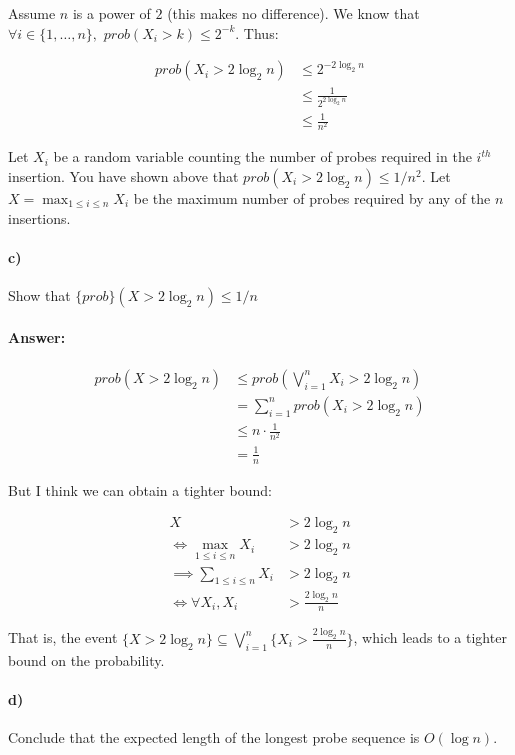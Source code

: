 \documentclass[a4paper]{article}
\begin{document}
Assume $n$ is a power of $2$ (this makes no difference). We know that $\forall i \in \{1, \ldots, n\},$
${prob}(X_i > k) \le 2^{-k}$. Thus:

\begin{align*}
{prob}(X_i > 2 \log_2 n) & \le 2^{-2\log_2 n} \\
& \le \frac{1}{2^{2 \log_2 n}} \\
& \le \frac{1}{n^2}
\end{align*}


\noindent Let $X_i$ be a random variable counting the number of probes required in the $i^{th}$ insertion. You have shown above that ${prob}(X_i > 2 \log_2 n) \le 1/n^2$. Let $X = \max_{1 \le i \le n} X_i$ be the maximum number of probes required by any of the $n$ insertions.


\paragraph{c)} Show that $\{prob\}(X > 2 \log_2 n) \le 1/n$


\paragraph{Answer:}

\begin{align*}
{prob}(X > 2 \log_2 n) & \le {prob}(\bigvee\limits_{i=1}^n X_i > 2 \log_2 n) \\
& = \sum\limits_{i=1}^n {prob}(X_i > 2 \log_2 n) \\
& \le n \cdot \frac{1}{n^2} \\
& = \frac{1}{n}
\end{align*}

But I think we can obtain a tighter bound:

\begin{align*}
X & > 2 \log_2 n \\
\iff \max\limits_{1 \le i \le n} X_i & > 2 \log_2 n \\
\implies \sum\limits_{1 \le i \le n} X_i & > 2 \log_2 n \\
\iff \forall X_i, X_i & > \frac{2 \log_2 n}{n}
\end{align*}

That is, the event $\{X > 2 \log_2 n\} \subseteq \bigvee\limits_{i=1}^n \{X_i > \frac{2 \log_2 n}{n}\}$, which leads to a tighter bound on the probability.

\paragraph{d)} Conclude that the expected length of the longest probe sequence is $O(\log n)$.
\end{document}
